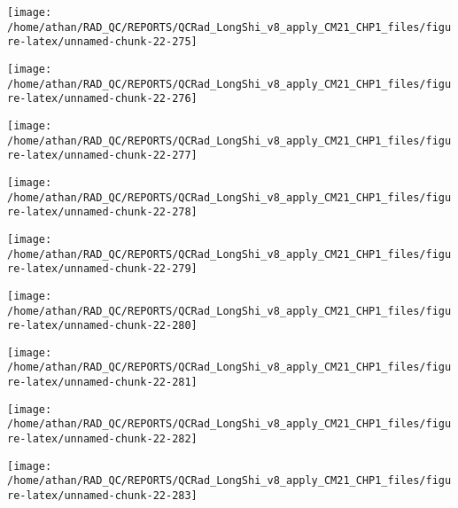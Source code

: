 \documentclass[
  10pt,
  a4paper,oneside]{article}
\begin{document}
\begin{center}\texttt{[image: /home/athan/RAD\_QC/REPORTS/QCRad\_LongShi\_v8\_apply\_CM21\_CHP1\_files/figure-latex/unnamed-chunk-22-275]} \end{center}

\begin{center}\texttt{[image: /home/athan/RAD\_QC/REPORTS/QCRad\_LongShi\_v8\_apply\_CM21\_CHP1\_files/figure-latex/unnamed-chunk-22-276]} \end{center}

\begin{center}\texttt{[image: /home/athan/RAD\_QC/REPORTS/QCRad\_LongShi\_v8\_apply\_CM21\_CHP1\_files/figure-latex/unnamed-chunk-22-277]} \end{center}

\begin{center}\texttt{[image: /home/athan/RAD\_QC/REPORTS/QCRad\_LongShi\_v8\_apply\_CM21\_CHP1\_files/figure-latex/unnamed-chunk-22-278]} \end{center}

\begin{center}\texttt{[image: /home/athan/RAD\_QC/REPORTS/QCRad\_LongShi\_v8\_apply\_CM21\_CHP1\_files/figure-latex/unnamed-chunk-22-279]} \end{center}

\begin{center}\texttt{[image: /home/athan/RAD\_QC/REPORTS/QCRad\_LongShi\_v8\_apply\_CM21\_CHP1\_files/figure-latex/unnamed-chunk-22-280]} \end{center}

\begin{center}\texttt{[image: /home/athan/RAD\_QC/REPORTS/QCRad\_LongShi\_v8\_apply\_CM21\_CHP1\_files/figure-latex/unnamed-chunk-22-281]} \end{center}

\begin{center}\texttt{[image: /home/athan/RAD\_QC/REPORTS/QCRad\_LongShi\_v8\_apply\_CM21\_CHP1\_files/figure-latex/unnamed-chunk-22-282]} \end{center}

\begin{center}\texttt{[image: /home/athan/RAD\_QC/REPORTS/QCRad\_LongShi\_v8\_apply\_CM21\_CHP1\_files/figure-latex/unnamed-chunk-22-283]} \end{center}
\end{document}

